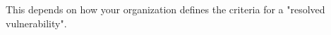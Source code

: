 
This depends on how your organization defines the criteria for a "resolved vulnerability".









